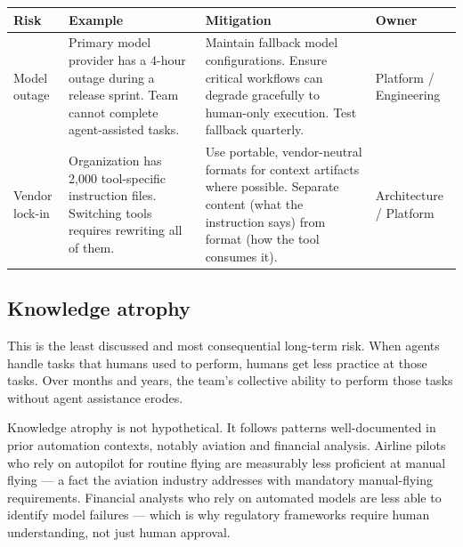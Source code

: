 \documentclass[
  a4paper,
  DIV=11,
  numbers=noendperiod]{scrreprt}
\newcounter{none} %
\begin{document}
{\def\LTcaptype{none} %
\begin{longtable}[]{@{}
  >{\raggedright\arraybackslash}p{}
  >{\raggedright\arraybackslash}p{}
  >{\raggedright\arraybackslash}p{}
  >{\raggedright\arraybackslash}p{}@{}}
\toprule\noalign{}
\begin{minipage}[b]{\linewidth}\raggedright
Risk
\end{minipage} & \begin{minipage}[b]{\linewidth}\raggedright
Example
\end{minipage} & \begin{minipage}[b]{\linewidth}\raggedright
Mitigation
\end{minipage} & \begin{minipage}[b]{\linewidth}\raggedright
Owner
\end{minipage} \\
\midrule\noalign{}
\endhead
\bottomrule\noalign{}
\endlastfoot
Model outage & Primary model provider has a 4-hour outage during a
release sprint. Team cannot complete agent-assisted tasks. & Maintain
fallback model configurations. Ensure critical workflows can degrade
gracefully to human-only execution. Test fallback quarterly. & Platform
/ Engineering \\
Vendor lock-in & Organization has 2,000 tool-specific instruction files.
Switching tools requires rewriting all of them. & Use portable,
vendor-neutral formats for context artifacts where possible. Separate
content (what the instruction says) from format (how the tool consumes
it). & Architecture / Platform \\
\end{longtable}
}

\subsection{Knowledge atrophy}\label{knowledge-atrophy}

This is the least discussed and most consequential long-term risk. When
agents handle tasks that humans used to perform, humans get less
practice at those tasks. Over months and years, the team's collective
ability to perform those tasks without agent assistance erodes.

Knowledge atrophy is not hypothetical. It follows patterns
well-documented in prior automation contexts, notably aviation and
financial analysis. Airline pilots who rely on autopilot for routine
flying are measurably less proficient at manual flying --- a fact the
aviation industry addresses with mandatory manual-flying requirements.
Financial analysts who rely on automated models are less able to
identify model failures --- which is why regulatory frameworks require
human understanding, not just human approval.
\end{document}
